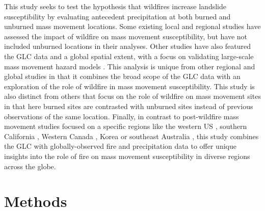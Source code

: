 \documentclass[nhess, manuscript]{copernicus}
\begin{document}
This study seeks to test the hypothesis that wildfires increase
landslide susceptibility by evaluating antecedent precipitation at both
burned and unburned mass movement locations. Some existing
local and regional studies \citep{cannonPredictingProbabilityVolume2010, rupertUsingLogisticRegression2003} have assessed the impact of wildfire on mass movement susceptibility, but have not included unburned locations in their analyses. Other
studies have also featured the GLC data and a global spatial extent,
with a focus on validating large-scale mass movement hazard models
\citep{kirschbaumSatelliteBasedAssessmentRainfallTriggered2018}. This analysis is unique from other
regional and global studies in that it combines the broad scope of the
GLC data with an exploration of the role of wildfire in mass movement
susceptibility. This study is also distinct from others that focus on
the role of wildfire on mass movement sites \citep{gartnerMutivariateStatisticalModels2009} in
that here burned sites are contrasted with unburned sites instead of
previous observations of the same location. Finally, in contrast to
post-wildfire mass movement studies focused on a specific regions like the
western US \citep{cannonIncreasingWildfirePostFire2009}, southern California 
\citep{gartnerEmpiricalModelsPredicting2014}, Western Canada \citep{jordan2015post}, 
Korea \citep{lee2019analysis} or southeast Australia 
\citep{nymanEvidenceDebrisFlow2011}, this study
combines the GLC with globally-observed fire and precipitation data to offer
unique insights into the role of fire on mass movement susceptibility in
diverse regions across the globe.

\section{Methods}\label{methods}
\end{document}
